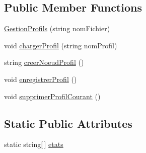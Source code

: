 \subsection*{Public Member Functions}
\begin{DoxyCompactItemize}
\item 
\hyperlink{group__inf2990_ga6be269ce83780615ca6cf0ebc3f4ac06}{Gestion\+Profils} (string nom\+Fichier)
\item 
void \hyperlink{group__inf2990_ga4d59c5b92806875d47381e9925d00f05}{charger\+Profil} (string nom\+Profil)
\item 
string \hyperlink{group__inf2990_ga90d8e981c3ff30ff39d4c5b2be5ddc3c}{creer\+Noeud\+Profil} ()
\item 
void \hyperlink{group__inf2990_gaf5f3faa7fb4e1886891400cad5b80205}{enregistrer\+Profil} ()
\item 
void \hyperlink{group__inf2990_gaf97ef191f41b6b30f0a1ad0ce043225a}{supprimer\+Profil\+Courant} ()
\end{DoxyCompactItemize}
\subsection*{Static Public Attributes}
\begin{DoxyCompactItemize}
\item 
static string\mbox{[}$\,$\mbox{]} \hyperlink{group__inf2990_ga1003b8f44d2b194f6a42df6a54f22370}{etats}
\end{DoxyCompactItemize}
